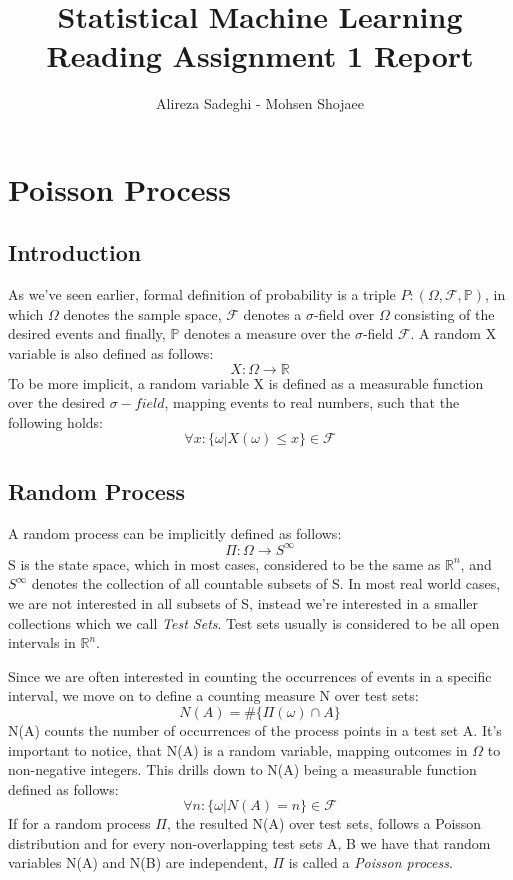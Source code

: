 \documentclass{article}
\title{Statistical Machine Learning \\ Reading Assignment 1 Report}
\author{Alireza Sadeghi - Mohsen Shojaee}
\begin{document}
\maketitle
    
\section{Poisson Process}
\subsection{Introduction}

As we've seen earlier, formal definition of probability is a triple $P: (\Omega, \mathcal{F}, \mathbb{P})$, in which $\Omega$ denotes the sample space, $\mathcal{F}$ denotes a $\sigma$-field over $\Omega$ consisting of the desired events and finally, $\mathbb{P}$ denotes a measure over the $\sigma$-field  $\mathcal{F}$.
A random X variable is also defined as follows: $$ X: \Omega \rightarrow \mathbb{R} $$
To be more implicit, a random variable X is defined as a measurable function over the desired $\sigma-field$, mapping events to real numbers, such that the following holds: $$ \forall x: \{\omega|X(\omega) \leq x \} \in \mathcal{F}$$

\subsection{Random Process}

A random process can be implicitly defined as follows: $$ \Pi: \Omega \rightarrow S^\infty $$
S is the state space, which in most cases, considered to be the same as $\mathbb{R}^n$, and $S^\infty$ denotes the collection of all countable subsets of S.
In most real world cases, we are not interested in all subsets of S, instead we're interested in a smaller collections which we call \textit{Test Sets}. Test sets usually is considered to be all open intervals in $\mathbb{R}^n$. 

Since we are often interested in counting the occurrences of events in a specific interval, we move on to define a counting measure N over test sets:
$$ N(A) = \# \{\Pi(\omega) \cap A\} $$
N(A) counts the number of occurrences of the process points in a test set A. It's important to notice, that N(A) is a random variable, mapping outcomes in $\Omega$ to non-negative integers. This drills down to N(A) being a measurable function defined as follows:
$$ \forall n: \{ \omega | N(A)=n\} \in \mathcal{F}$$ 
If for a random process $\Pi$, the resulted N(A) over test sets, follows a Poisson distribution and for every non-overlapping test sets A, B we have that random variables N(A) and N(B) are independent, $\Pi$ is called a \textit{Poisson process}.
\end{document}
